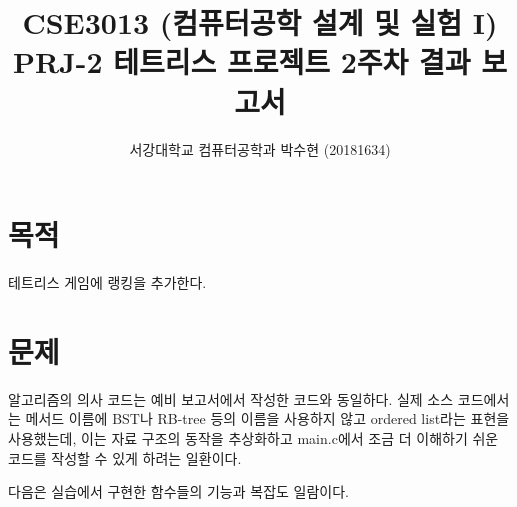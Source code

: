 
    
\usepackage{subfig}



\title{CSE3013 (컴퓨터공학 설계 및 실험 I) \space \newline PRJ-2 테트리스 프로젝트 2주차 결과 보고서}
\author{서강대학교 컴퓨터공학과 박수현 (20181634)}
\maketitle

\section{목적}
테트리스 게임에 랭킹을 추가한다.

\section{문제}
알고리즘의 의사 코드는 예비 보고서에서 작성한 코드와 동일하다. 실제 소스 코드에서는 메서드 이름에 BST나 RB-tree 등의 
이름을 사용하지 않고 ordered list라는 표현을 사용했는데, 이는 자료 구조의 동작을 추상화하고 main.c에서 조금 더 이해하기 쉬운 코드를 작성할 수 있게 하려는 일환이다. 

\newpage

다음은 실습에서 구현한 함수들의 기능과 복잡도 일람이다. 

